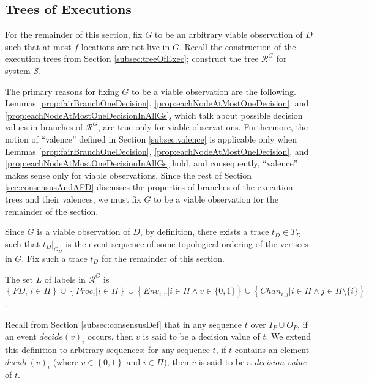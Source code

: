 \documentclass[11pt]{article}
\numberwithin{theorem}{section}
\newcommand{\set}[1]{\left\{#1\right\}}
\begin{document}
\subsection{Trees of Executions}\label{subsec:consensusTree}
For the remainder of this section, fix $G$ to be an arbitrary
viable observation of $D$ such that at most $f$ locations are not
live in $G$. Recall the construction of the execution trees from Section \ref{subsec:treeOfExec}; construct
the tree $\mathcal{R}^{G}$ for system $\mathcal{S}$. 

The primary reasons for fixing $G$ to be a viable observation are the following. Lemmas \ref{prop:fairBranchOneDecision}, \ref{prop:eachNodeAtMostOneDecision}, and \ref{prop:eachNodeAtMostOneDecisionInAllGs}, which talk about possible decision values in branches of $\mathcal{R}^{G}$, are true only for viable observations. Furthermore, the notion of ``valence'' defined in Section \ref{subsec:valence} is applicable only when Lemmas \ref{prop:fairBranchOneDecision}, \ref{prop:eachNodeAtMostOneDecision}, and \ref{prop:eachNodeAtMostOneDecisionInAllGs} hold, and consequently, ``valence'' makes sense only for viable observations. Since the rest of Section \ref{sec:consensusAndAFD} discusses the properties of branches of the execution trees and their valences, we must fix $G$ to be a viable observation for the remainder of the section.



Since $G$ is a viable observation of $D$, by definition, there exists a trace $t_D \in T_D$ such that
$t_D|_{O_D}$ is the event sequence of some topological ordering of the
vertices in $G$. Fix such a trace $t_D$ for the remainder of this section.

The set $L$ of labels in  $\mathcal{R}^{G}$ is $\set{FD_i|i\in\Pi}
\cup \set{Proc_i| i \in \Pi} \cup  \set{Env_{i,v}|i\in\Pi \wedge v \in
  \{0,1\}} \cup \set{Chan_{i,j}| i\in\Pi \wedge j
  \in \Pi \setminus \{i\}}$. 

Recall from Section \ref{subsec:consensusDef} that in any sequence $t$
over $I_P \cup O_P$, if an event $decide(v)_i$ occurs, then $v$ is
said to be a decision value of $t$. We extend this definition to
arbitrary sequences; for any sequence $t$, if $t$ contains an element
$decide(v)_i$ (where $v \in \set{0,1}$ and $i \in \Pi$), then $v$ is
said to be a \emph{decision value} of $t$.
\end{document}
